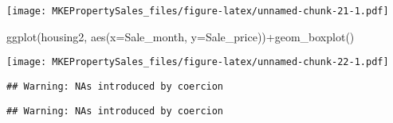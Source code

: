 \documentclass[
]{article}
\newenvironment{Shaded}{\begin{snugshade}}{\end{snugshade}}
\newcommand{\AttributeTok}[1]{\textcolor[rgb]{0.77,0.63,0.00}{#1}}
\newcommand{\FunctionTok}[1]{\textcolor[rgb]{0.00,0.00,0.00}{#1}}
\newcommand{\NormalTok}[1]{#1}
\newcommand{\OtherTok}[1]{\textcolor[rgb]{0.56,0.35,0.01}{#1}}
\newcommand{\SpecialCharTok}[1]{\textcolor[rgb]{0.00,0.00,0.00}{#1}}
\begin{document}
\texttt{[image: MKEPropertySales\_files/figure-latex/unnamed-chunk-21-1.pdf]}

\begin{Shaded}
\begin{Highlighting}[]
\FunctionTok{ggplot}\NormalTok{(housing2, }\FunctionTok{aes}\NormalTok{(}\AttributeTok{x=}\NormalTok{Sale\_month, }\AttributeTok{y=}\NormalTok{Sale\_price))}\SpecialCharTok{+}\FunctionTok{geom\_boxplot}\NormalTok{()}
\end{Highlighting}
\end{Shaded}

\texttt{[image: MKEPropertySales\_files/figure-latex/unnamed-chunk-22-1.pdf]}

\begin{Shaded}
\end{Shaded}

\begin{verbatim}
## Warning: NAs introduced by coercion
\end{verbatim}

\begin{Shaded}
\end{Shaded}

\begin{verbatim}
## Warning: NAs introduced by coercion
\end{verbatim}
\end{document}
